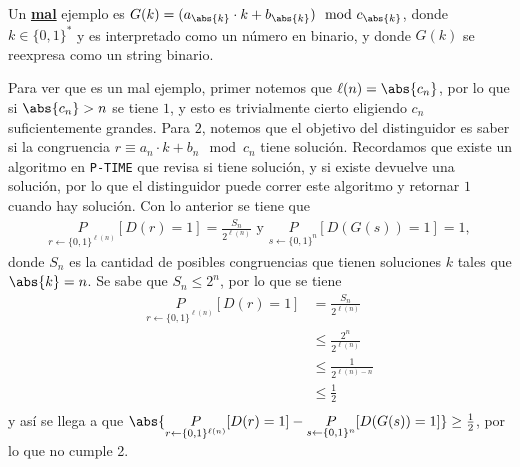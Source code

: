 \documentclass{ayudantia}
\begin{document}
\begin{ejm}
    Un \textbf{\underline{mal}} ejemplo es \(G(k)=(a_{\abs{k}}\cdot k+b_{\abs{k}})\mod c_{\abs{k}}\), donde \(k\in\{0,1\}^*\) y es interpretado como un número en binario, y donde \(G(k)\) se reexpresa como un string binario.

    Para ver que es un mal ejemplo, primer notemos que \(\ell(n)=\abs{c_n}\), por lo que si \(\abs{c_n}>n\) se tiene \(1\), y esto es trivialmente cierto eligiendo \(c_n\) suficientemente grandes. Para \(2\), notemos que el objetivo del distinguidor es saber si la congruencia \(r\equiv a_n\cdot k+b_n\mod c_n\) tiene solución. Recordamos que existe un algoritmo en \texttt{P-TIME} que revisa si tiene solución, y si existe devuelve una solución, por lo que el distinguidor puede correr este algoritmo y retornar \(1\) cuando hay solución. Con lo anterior se tiene que 
    \begin{align*}
        \underset{r\leftarrow\{0,1\}^{\ell(n)}}{P}[D(r)=1]=\frac{S_n}{2^{\ell(n)}}\text{ y }\underset{s\leftarrow\{0,1\}^n}{P}[D(G(s))=1]=1,
    \end{align*}
    donde \(S_n\) es la cantidad de posibles congruencias que tienen soluciones \(k\) tales que \(\abs{k}=n\). Se sabe que \(S_n\leq 2^n\), por lo que se tiene
    \begin{align*}
        \underset{r\leftarrow\{0,1\}^{\ell(n)}}{P}[D(r)=1]&=\frac{S_n}{2^{\ell(n)}}\\
        &\leq\frac{2^n}{2^{\ell(n)}}\\
        &\leq\frac1{2^{\ell(n)-n}}\\
        &\leq\frac12\\
    \end{align*}
    y así se llega a que \(\abs{\underset{r\leftarrow\{0,1\}^{\ell(n)}}{P}[D(r)=1]-\underset{s\leftarrow\{0,1\}^n}{P}[D(G(s))=1]}\geq\frac12\), por lo que no cumple 2.
\end{ejm}
\end{document}

